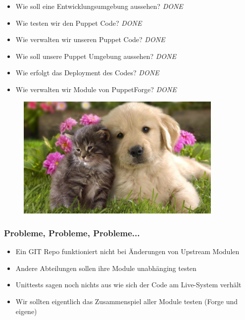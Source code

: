 \documentclass{beamer}
\begin{document}
\begin{frame}
  \begin{itemize}
  \item Wie soll eine Entwicklungsumgebung aussehen? \emph{\color{green}DONE}
  \item Wie testen wir den Puppet Code? \emph{\color{green}DONE}
  \item Wie verwalten wir unseren Puppet Code? \emph{\color{green}DONE}
  \item Wie soll unsere Puppet Umgebung aussehen?  \emph{\color{green}DONE}
  \item Wie erfolgt das Deployment des Codes? \emph{\color{green}DONE}
  \item Wie verwalten wir Module von PuppetForge? \emph{\color{green}DONE}
  \end{itemize}
\end{frame}

\begin{frame}
  \begin{figure}[ht]
    \centering
      \includegraphics[height=6cm,width=10cm]{../pics/puppy.png}
    \label{fig:stack}
  \end{figure}
\end{frame}

\begin{frame}
  \frametitle{Probleme, Probleme, Probleme...}

  \begin{itemize}
  \item Ein GIT Repo funktioniert nicht bei Änderungen von Upstream Modulen
  \item Andere Abteilungen sollen ihre Module unabhänging testen
  \item Unittests sagen noch nichts aus wie sich der Code am Live-System verhält
  \item Wir sollten eigentlich das Zusammenspiel aller Module testen (Forge und eigene)
  \end{itemize}
\end{frame}
\end{document}
